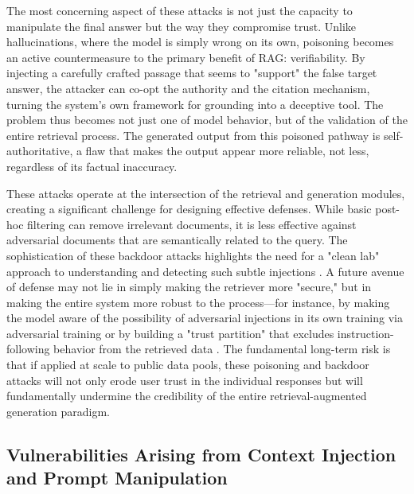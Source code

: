 \documentclass[11pt,a4paper]{article}
\begin{document}
The most concerning aspect of these attacks is not just the capacity to manipulate the final answer but the way they compromise trust. Unlike hallucinations, where the model is simply wrong on its own, poisoning becomes an active countermeasure to the primary benefit of RAG: verifiability. By injecting a carefully crafted passage that seems to "support" the false target answer, the attacker can co-opt the authority and the citation mechanism, turning the system's own framework for grounding into a deceptive tool. The problem thus becomes not just one of model behavior, but of the validation of the entire retrieval process. The generated output from this poisoned pathway is self-authoritative, a flaw that makes the output appear more reliable, not less, regardless of its factual inaccuracy.

These attacks operate at the intersection of the retrieval and generation modules, creating a significant challenge for designing effective defenses. While basic post-hoc filtering can remove irrelevant documents, it is less effective against adversarial documents that are semantically related to the query. The sophistication of these backdoor attacks highlights the need for a "clean lab" approach to understanding and detecting such subtle injections \cite{arxiv:2312.10997v5}. A future avenue of defense may not lie in simply making the retriever more "secure," but in making the entire system more robust to the process---for instance, by making the model aware of the possibility of adversarial injections in its own training via adversarial training or by building a "trust partition" that excludes instruction-following behavior from the retrieved data \cite{arxiv:2312.10997v5}. The fundamental long-term risk is that if applied at scale to public data pools, these poisoning and backdoor attacks will not only erode user trust in the individual responses but will fundamentally undermine the credibility of the entire retrieval-augmented generation paradigm.


\subsection{Vulnerabilities Arising from Context Injection and Prompt Manipulation}
\end{document}
